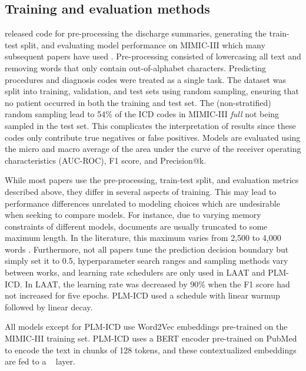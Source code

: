 {\subsection{Training and evaluation methods}\label{sec: training and evaluation methods}

\textcite{mullenbachExplainablePredictionMedical2018} released code for pre-processing the discharge summaries, generating the train-test split, and evaluating model performance on MIMIC-III which many subsequent papers have used \parencite{vuLabelAttentionModel2020, huangPLMICDAutomaticICD2022, liICDCodingClinical2020, baoMedicalCodePrediction2021, yuanCodeSynonymsMatter2022, kimReadAttendCode2021}.
Pre-processing consisted of lowercasing all text and removing words that only contain out-of-alphabet characters. Predicting procedures and diagnosis codes were treated as a single task.
The dataset was split into training, validation, and test sets using random sampling, ensuring that no patient occurred in both the training and test set. The (non-stratified) random sampling lead to 54\% of the ICD codes in MIMIC-III \textit{full} not being sampled in the test set. This complicates the interpretation of results since these codes only contribute true negatives or false positives. 
Models are evaluated using the micro and macro average of the area under the curve of the receiver operating characteristics (AUC-ROC), F1 score, and Precision@k. 

While most papers use the pre-processing, train-test split, and evaluation metrics described above, they differ in several aspects of training. This may lead to performance differences unrelated to modeling choices which are undesirable when seeking to compare models. 
For instance, due to varying memory constraints of different models, documents are usually truncated to some maximum length. In the literature, this maximum varies from 2,500 to 4,000 words \parencite{mullenbachExplainablePredictionMedical2018, vuLabelAttentionModel2020, huangPLMICDAutomaticICD2022}.
Furthermore, not all papers tune the prediction decision boundary but simply set it to 0.5,
 hyperparameter search ranges and sampling methods  vary between works, and learning rate schedulers are only used in LAAT and PLM-ICD\parencite{mullenbachExplainablePredictionMedical2018, liICDCodingClinical2020}. In LAAT, the learning rate was decreased by 90\% when the F1 score had not increased for five epochs. PLM-ICD used a schedule with linear warmup followed by linear decay. 

All models except for PLM-ICD use Word2Vec embeddings pre-trained on the MIMIC-III training set. PLM-ICD uses a BERT encoder pre-trained on PubMed to encode the text in chunks of 128 tokens, and these contextualized embeddings are fed to a \lalaat~ layer. 

}
